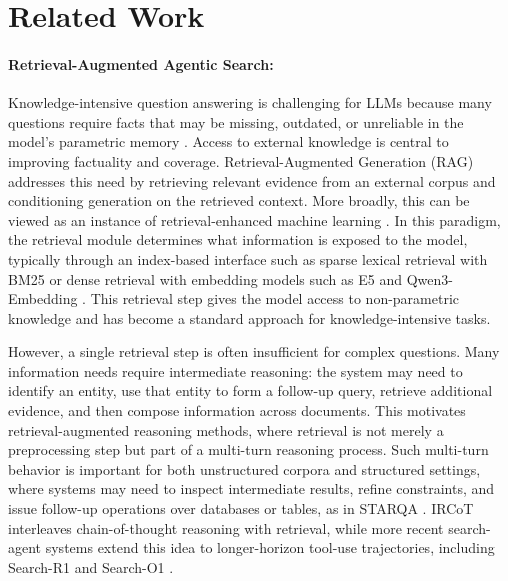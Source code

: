 \documentclass{article} %
\begin{document}
\section{Related Work}


\paragraph{Retrieval-Augmented Agentic Search:}


Knowledge-intensive question answering is challenging for LLMs because many questions require facts that may be missing, outdated, or unreliable in the model's parametric memory \citep{popqa}. Access to external knowledge is central to improving factuality and coverage. Retrieval-Augmented Generation (RAG) \citep{rag} addresses this need by retrieving relevant evidence from an external corpus and conditioning generation on the retrieved context. More broadly, this can be viewed as an instance of retrieval-enhanced machine learning \citep{REML}. In this paradigm, the retrieval module determines what information is exposed to the model, typically through an index-based interface such as sparse lexical retrieval with BM25 \citep{bm25} or dense retrieval with embedding models such as E5 \citep{e5} and Qwen3-Embedding \citep{qwen3embedding}. This retrieval step gives the model access to non-parametric knowledge and has become a standard approach for knowledge-intensive tasks.

However, a single retrieval step is often insufficient for complex questions. Many information needs require intermediate reasoning: the system may need to identify an entity, use that entity to form a follow-up query, retrieve additional evidence, and then compose information across documents. This motivates retrieval-augmented reasoning methods, where retrieval is not merely a preprocessing step but part of a multi-turn reasoning process. Such multi-turn behavior is important for both unstructured corpora and structured settings, where systems may need to inspect intermediate results, refine constraints, and issue follow-up operations over databases or tables, as in STARQA \citep{starqa}. IRCoT \citep{ircot} interleaves chain-of-thought reasoning with retrieval, while more recent search-agent systems extend this idea to longer-horizon tool-use trajectories, including Search-R1 \citep{search-r1} and Search-O1 \citep{search-o1}.
\end{document}
